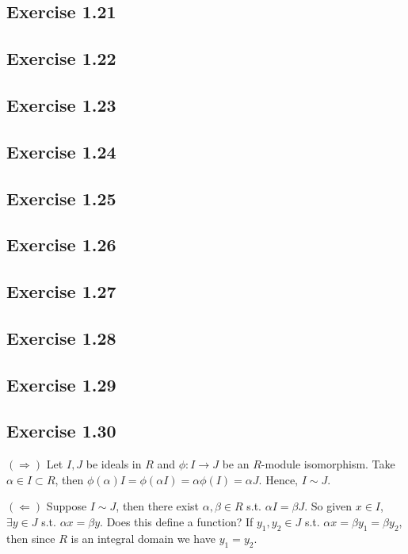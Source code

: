 \documentclass[../Marcus.tex]{subfiles}
\begin{document}
\subsection*{Exercise 1.21}

\subsection*{Exercise 1.22}

\subsection*{Exercise 1.23}

\subsection*{Exercise 1.24}

\subsection*{Exercise 1.25}

\subsection*{Exercise 1.26}

\subsection*{Exercise 1.27}

\subsection*{Exercise 1.28}

\subsection*{Exercise 1.29}

\subsection*{Exercise 1.30}

$(\Rightarrow)$ Let $I,J$ be ideals in $R$ and $\phi:I \to J$ be an $R$-module isomorphism. Take $\alpha\in I\subset R$, then $\phi(\alpha)I=\phi(\alpha I)=\alpha\phi(I)=\alpha J$. Hence, $I\sim J$.

$(\Leftarrow)$ Suppose $I\sim J$, then there exist $\alpha,\beta\in R$ s.t. $\alpha I=\beta J$. So given $x\in I$, $\exists y\in J$ s.t. $\alpha x=\beta y$. Does this define a function? If $y_1,y_2\in J$ s.t. $\alpha x=\beta y_1=\beta y_2$, then since $R$ is an integral domain we have $y_1=y_2$.
\end{document}
